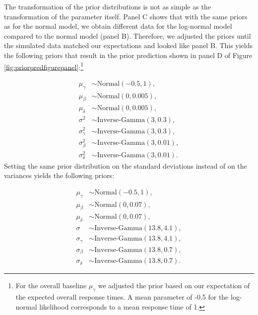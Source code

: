 \documentclass[
  english,
  doc,floatsintext]{apa6}
\begin{document}
The transformation of the prior distributions is not as simple as the transformation of the parameter itself. Panel C shows that with the same priors as for the normal model, we obtain different data for the log-normal model compared to the normal model (panel B). Therefore, we adjusted the priors until the simulated data matched our expectations and looked like panel B. This yields the following priors that result in the prior prediction shown in panel D of Figure \ref{fig:priorpredfigurepanel}:\footnote{For the overall baseline \(\mu_\gamma\) we adjusted the prior based on our expectation of the expected overall response times. A mean parameter of -0.5 for the log-normal likelihood corresponds to a mean response time of 1.}

\begin{equation}
\begin{aligned}
\mu_{\gamma} &\sim \text{Normal}(-0.5, 1), \label{eq:chosenpriorslogvar} \\
\mu_{\beta} &\sim \text{Normal}(0, 0.005), \\
\mu_{\delta} &\sim \text{Normal}(0, 0.005), \\
\sigma^2 &\sim \text{Inverse-Gamma}(3, 0.3),  \\
\sigma^2_{\gamma} &\sim \text{Inverse-Gamma}(3, 0.3), \\   
\sigma^2_{\beta} &\sim \text{Inverse-Gamma}(3, 0.01), \\   
\sigma^2_{\delta} &\sim \text{Inverse-Gamma}(3, 0.01).    
\end{aligned}
\end{equation}
Setting the same prior distribution on the standard deviations instead of on the variances yields the following priors:

\begin{equation}
\begin{aligned}
\mu_{\gamma} &\sim \text{Normal}(-0.5, 1), \label{eq:chosenpriorslogsd} \\
\mu_{\beta} &\sim \text{Normal}(0, 0.07), \\
\mu_{\delta} &\sim \text{Normal}(0, 0.07), \\
\sigma &\sim \text{Inverse-Gamma}(13.8, 4.1),  \\
\sigma_{\gamma} &\sim \text{Inverse-Gamma}(13.8, 4.1), \\   
\sigma_{\beta} &\sim \text{Inverse-Gamma}(13.8, 0.7), \\   
\sigma_{\delta} &\sim \text{Inverse-Gamma}(13.8, 0.7).    
\end{aligned}
\end{equation}
\end{document}
